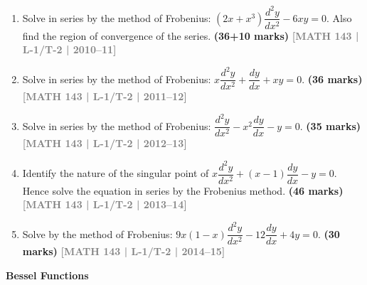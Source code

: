 \documentclass[12pt,a4paper]{article}
\newcommand{\yr}[1]{\hfill\textcolor{gray}{\small\textbf{[#1]}}}
\newcommand{\mk}[1]{\textcolor{orange!70!black}{\small\textbf{(#1 marks)}}}
\newcommand{\subtopic}[2]{%
  \vspace{10pt}
  \noindent\begin{tcolorbox}[colback=#1!8,colframe=#1,boxrule=0.6pt,arc=4pt,
    left=6pt,right=6pt,top=4pt,bottom=4pt]
    \small\bfseries\textcolor{#1}{#2}
  \end{tcolorbox}
  \vspace{2pt}
}
\begin{document}
\begin{enumerate}

\item Solve in series by the method of Frobenius: $(2x+x^{3})\dfrac{d^{2}y}{dx^{2}}-6xy=0$. Also find the region of convergence of the series.
\mk{36\textonehalf+10} \yr{MATH 143 | L-1/T-2 | 2010--11}

\item Solve in series by the method of Frobenius: $x\dfrac{d^{2}y}{dx^{2}}+\dfrac{dy}{dx}+xy=0$.
\mk{36\textonehalf} \yr{MATH 143 | L-1/T-2 | 2011--12}

\item Solve in series by the method of Frobenius: $\dfrac{d^{2}y}{dx^{2}}-x^{2}\dfrac{dy}{dx}-y=0$.
\mk{35} \yr{MATH 143 | L-1/T-2 | 2012--13}

\item Identify the nature of the singular point of $x\dfrac{d^{2}y}{dx^{2}}+(x-1)\dfrac{dy}{dx}-y=0$. Hence solve the equation in series by the Frobenius method.
\mk{46\textonehalf} \yr{MATH 143 | L-1/T-2 | 2013--14}

\item Solve by the method of Frobenius: $9x(1-x)\dfrac{d^{2}y}{dx^{2}}-12\dfrac{dy}{dx}+4y=0$.
\mk{30} \yr{MATH 143 | L-1/T-2 | 2014--15}

\end{enumerate}

\subtopic{cI}{Bessel Functions}
\label{sub:s11-bessel}
\end{document}
